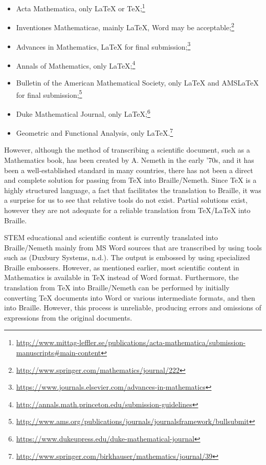 \documentclass[11.5pt]{sig-alternate} %
\begin{document}
\begin{large}
\begin{itemize}
    \item 	Acta Mathematica, only LaTeX or TeX;\footnote{\url{http://www.mittag-leffler.se/publications/acta-mathematica/submission-manuscripts\#main-content}}
    \item 	Inventiones Mathematicae, mainly LaTeX, Word may be acceptable;\footnote{\url{http://www.springer.com/mathematics/journal/222}}
    \item 	Advances in Mathematics, LaTeX for final submission;\footnote{\url{https://www.journals.elsevier.com/advances-in-mathematics}}
    \item 	Annals of Mathematics, only LaTeX;\footnote{\url{http://annals.math.princeton.edu/submission-guidelines}}
    \item 	Bulletin of the American Mathematical Society, only LaTeX and AMSLaTeX for final submission;\footnote{\url{http://www.ams.org/publications/journals/journalsframework/bullsubmit}}
    \item 	Duke Mathematical Journal, only LaTeX;\footnote{\url{https://www.dukeupress.edu/duke-mathematical-journal}}
    \item 	Geometric and Functional Analysis, only LaTeX.\footnote{\url{http://www.springer.com/birkhauser/mathematics/journal/39}}
\end{itemize}

However, although the method of transcribing a scientific document, such as a Mathematics book, has been created by A. Nemeth in the early ’70s, and it has been a well-established standard in many countries, there has not been a direct and complete solution for passing from TeX into Braille/Nemeth. Since TeX is a highly structured language, a fact that facilitates the translation to Braille, it was a surprise for us to see that relative tools do not exist. Partial solutions exist, however they are not adequate for a reliable translation from TeX/LaTeX into Braille. 

STEM educational and scientific content is currently translated into Braille/Nemeth mainly from MS Word sources that are transcribed by using tools such as (Duxbury Systems, n.d.). The output is embossed by using specialized Braille embossers. However, as mentioned earlier, most scientific content in Mathematics is available in TeX instead of Word format. Furthermore, the translation from TeX into Braille/Nemeth can be performed by initially converting TeX documents into Word or various intermediate formats, and then into Braille. However, this process is unreliable, producing errors and omissions of expressions from the original documents.


\end{large}
\end{document}
